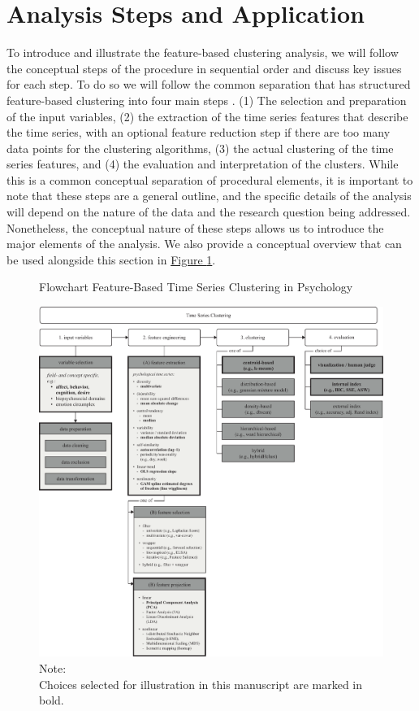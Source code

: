 \documentclass[man, 12pt, a4paper, floatsintext]{apa7}
\theoremstyle{break}
\theoremstyle{plain}
\newcommand{\fgrref}[2][]{\hyperref[#2]{Figure \ref*{#2}#1}}
\begin{document}
\section{Analysis Steps and Application} 

To introduce and illustrate the feature-based clustering analysis, we will follow the conceptual steps of the procedure in sequential order and discuss key issues for each step. To do so we will follow the common separation that has structured feature-based clustering into four main steps \citep{rasanen2009, wang2006}. (1) The selection and preparation of the input variables, (2) the extraction of the time series features that describe the time series, with an optional feature reduction step if there are too many data points for the clustering algorithms, (3) the actual clustering of the time series features, and (4) the evaluation and interpretation of the clusters. 
While this is a common conceptual separation of procedural elements, it is important to note that these steps are a general outline, and the specific details of the analysis will depend on the nature of the data and the research question being addressed. Nonetheless, the conceptual nature of these steps allows us to introduce the major elements of the analysis. We also provide a conceptual overview that can be used alongside this section in \fgrref{fig:TSCFlow}.

\begin{figure}[!ht] %
  \caption{Flowchart Feature-Based Time Series Clustering in Psychology}
  \label{fig:TSCFlow}
  \centering\includegraphics[width=\textwidth]{figures/TS Cluster Flow/TimeSeriesClusterFlowSelection.pdf}
  \caption*{Note: \\
  Choices selected for illustration in this manuscript are marked in bold.}
\end{figure}
\end{document}
